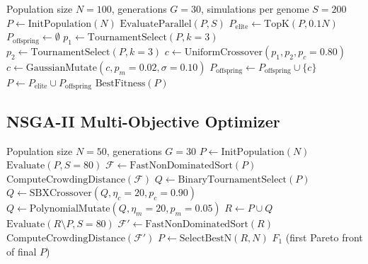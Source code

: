 \begin{algorithm}[H]
\caption{Single-Objective Genetic Algorithm for Game Balancing}
\label{alg:ga}
\begin{algorithmic}[1]
\Require Population size $N=100$, generations $G=30$, simulations per genome $S=200$
\State $P \gets \text{InitPopulation}(N)$  
    \State $\text{EvaluateParallel}(P, S)$  
    \State $P_{\text{elite}} \gets \text{TopK}(P, 0.1N)$  
    \State $P_{\text{offspring}} \gets \emptyset$
        \State $p_1 \gets \text{TournamentSelect}(P, k=3)$
        \State $p_2 \gets \text{TournamentSelect}(P, k=3)$
        \State $c \gets \text{UniformCrossover}(p_1, p_2, p_c=0.80)$
        \State $c \gets \text{GaussianMutate}(c, p_m=0.02, \sigma=0.10)$
        \State $P_{\text{offspring}} \gets P_{\text{offspring}} \cup \{c\}$
    \EndWhile
    \State $P \gets P_{\text{elite}} \cup P_{\text{offspring}}$
\EndFor
\State \Return $\text{BestFitness}(P)$
\end{algorithmic}
\end{algorithm}

\subsection*{NSGA-II Multi-Objective Optimizer}

\begin{algorithm}[H]
\caption{NSGA-II for Multi-Objective Game Balancing}
\label{alg:nsga2}
\begin{algorithmic}[1]
\Require Population size $N=50$, generations $G=30$
\State $P \gets \text{InitPopulation}(N)$
\State $\text{Evaluate}(P, S=80)$  
    \State $\mathcal{F} \gets \text{FastNonDominatedSort}(P)$  
    \State $\text{ComputeCrowdingDistance}(\mathcal{F})$
    \State $Q \gets \text{BinaryTournamentSelect}(P)$  
    \State $Q \gets \text{SBXCrossover}(Q, \eta_c=20, p_c=0.90)$
    \State $Q \gets \text{PolynomialMutate}(Q, \eta_m=20, p_m=0.05)$
    \State $R \gets P \cup Q$  
    \State $\text{Evaluate}(R \setminus P, S=80)$  
    \State $\mathcal{F}' \gets \text{FastNonDominatedSort}(R)$
    \State $\text{ComputeCrowdingDistance}(\mathcal{F}')$
    \State $P \gets \text{SelectBestN}(R, N)$  
\EndFor
\State \Return $F_1$ (first Pareto front of final $P$)
\end{algorithmic}
\end{algorithm}

